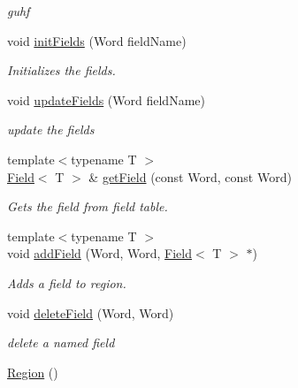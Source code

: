 \begin{DoxyCompactItemize}
\begin{DoxyCompactList}\small\item\em guhf \item\end{DoxyCompactList}\item 
void \hyperlink{classHSF_1_1Region_a04109e318bad70575bf6aa0f810913bf}{initFields} (Word fieldName)
\begin{DoxyCompactList}\small\item\em Initializes the fields. \item\end{DoxyCompactList}\item 
void \hyperlink{classHSF_1_1Region_a4a3da7e779636d389f013301006a02b4}{updateFields} (Word fieldName)
\begin{DoxyCompactList}\small\item\em update the fields \item\end{DoxyCompactList}\item 
{\footnotesize template$<$typename T $>$ }\\\hyperlink{classHSF_1_1Field}{Field}$<$ T $>$ \& \hyperlink{classHSF_1_1Region_ad6b6fb8af5a80adae5aa77b04a092a01}{getField} (const Word, const Word)
\begin{DoxyCompactList}\small\item\em Gets the field from field table. \item\end{DoxyCompactList}\item 
{\footnotesize template$<$typename T $>$ }\\void \hyperlink{classHSF_1_1Region_aec3f0520f9618a0e0d92a5c2a102b980}{addField} (Word, Word, \hyperlink{classHSF_1_1Field}{Field}$<$ T $>$ $\ast$)
\begin{DoxyCompactList}\small\item\em Adds a field to region. \item\end{DoxyCompactList}\item 
void \hyperlink{classHSF_1_1Region_ab74797105c6eaf54c3d5101a919d15b6}{deleteField} (Word, Word)
\begin{DoxyCompactList}\small\item\em delete a named field \item\end{DoxyCompactList}\item 
\hyperlink{classHSF_1_1Region_aa31738c265f5192d61a8a7b8f89c972a}{Region} ()
\item 

\end{DoxyCompactItemize}

